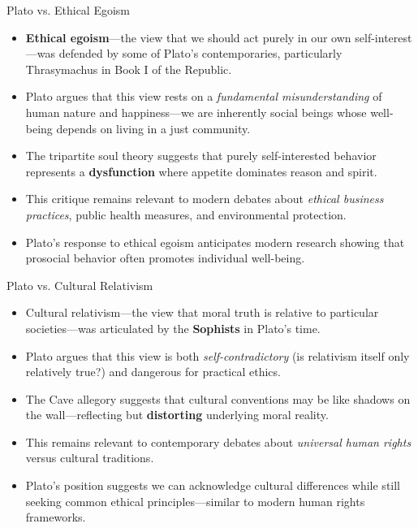 \documentclass[aspectratio=169]{beamer}
\begin{document}
\begin{frame}{Plato vs. Ethical Egoism}
\begin{itemize}
\item \textbf{Ethical egoism}—the view that we should act purely in our own self-interest—was defended by some of Plato's contemporaries, particularly Thrasymachus in Book I of the Republic.
\item Plato argues that this view rests on a \emph{fundamental misunderstanding} of human nature and happiness—we are inherently social beings whose well-being depends on living in a just community.
\item The tripartite soul theory suggests that purely self-interested behavior represents a \textbf{dysfunction} where appetite dominates reason and spirit.
\item This critique remains relevant to modern debates about \emph{ethical business practices}, public health measures, and environmental protection.
\item Plato's response to ethical egoism anticipates modern research showing that prosocial behavior often promotes individual well-being.
\end{itemize}
\end{frame}

\begin{frame}{Plato vs. Cultural Relativism}
\begin{itemize}
\item Cultural relativism—the view that moral truth is relative to particular societies—was articulated by the \textbf{Sophists} in Plato's time.
\item Plato argues that this view is both \emph{self-contradictory} (is relativism itself only relatively true?) and dangerous for practical ethics.
\item The Cave allegory suggests that cultural conventions may be like shadows on the wall—reflecting but \textbf{distorting} underlying moral reality.
\item This remains relevant to contemporary debates about \emph{universal human rights} versus cultural traditions.
\item Plato's position suggests we can acknowledge cultural differences while still seeking common ethical principles—similar to modern human rights frameworks.
\end{itemize}
\end{frame}
\end{document}
